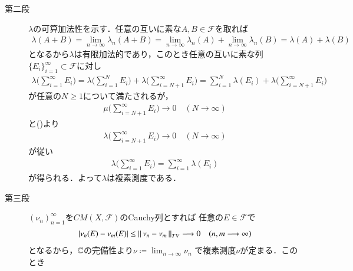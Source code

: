 \begin{prf}
\begin{description}
			\item[第二段] $\lambda$の可算加法性を示す．任意の互いに素な$A,B \in \mathscr{F}$を取れば
				\begin{align}
					\lambda(A + B) = \lim_{n \to \infty} \lambda_n(A + B)
					= \lim_{n \to \infty} \lambda_n(A) + \lim_{n \to \infty} \lambda_n(B)
					= \lambda(A) + \lambda(B)
				\end{align}
				となるから$\lambda$は有限加法的であり，このとき任意の互いに素な列$\{E_i\}_{i=1}^\infty \subset \mathscr{F}$に対し
				\begin{align}
					\lambda\Biggl( \sum_{i=1}^\infty E_i \Biggr)
					= \lambda\Biggl( \sum_{i=1}^N E_i \Biggr) + \lambda\Biggl( \sum_{i=N+1}^\infty E_i \Biggr)
					= \sum_{i=1}^N \lambda(E_i) + \lambda\Biggl( \sum_{i=N+1}^\infty E_i \Biggr)
				\end{align}
				が任意の$N \geq 1$について満たされるが，
				\begin{align}
					\mu\Biggl( \sum_{i=N+1}^\infty E_i \Biggr) \longrightarrow 0 \quad (N \longrightarrow \infty)
				\end{align}
				と()より
				\begin{align}
					\lambda\Biggl( \sum_{i=N+1}^\infty E_i \Biggr) \longrightarrow 0 \quad (N \longrightarrow \infty)
				\end{align}
				が従い
				\begin{align}
					\lambda\Biggl( \sum_{i=1}^\infty E_i \Biggr) = \sum_{i=1}^\infty \lambda(E_i)
				\end{align}
				が得られる．よって$\lambda$は複素測度である．
				
			\item[第三段]
				$(\nu_n)_{n=1}^\infty$を$CM(X,\mathscr{F})$のCauchy列とすれば
				任意の$E \in \mathscr{F}$で
				\begin{align}
					|\nu_n(E) - \nu_m(E)| \leq \left\|\, \nu_n-\nu_m\, \right\|_{TV} 
					\longrightarrow 0
					\quad (n,m \longrightarrow \infty)
				\end{align}
				となるから，$\mathbb{C}$の完備性より$\nu \coloneqq \lim_{n \to \infty} \nu_n$
				で複素測度$\nu$が定まる．このとき
				\QED
		\end{description}
	\end{prf}
	
